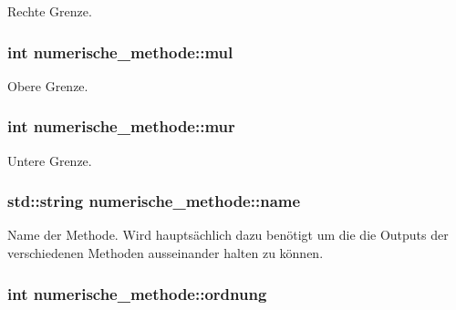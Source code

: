 Rechte Grenze. \hypertarget{classnumerische__methode_a20e0d47e90b9a0f9a83aab2b225a4616}{
\subsubsection[{mul}]{\setlength{\rightskip}{0pt plus 5cm}int numerische\-\_\-methode\-::mul\hspace{0.3cm}{\ttfamily [protected]}}}\label{classnumerische__methode_a20e0d47e90b9a0f9a83aab2b225a4616}
Obere Grenze. \hypertarget{classnumerische__methode_a36f2c35ed9b3448c6bb8656e057ae44a}{
\subsubsection[{mur}]{\setlength{\rightskip}{0pt plus 5cm}int numerische\-\_\-methode\-::mur\hspace{0.3cm}{\ttfamily [protected]}}}\label{classnumerische__methode_a36f2c35ed9b3448c6bb8656e057ae44a}
Untere Grenze. \hypertarget{classnumerische__methode_a08429f7cae828958ced4b62db2cf1021}{
\subsubsection[{name}]{\setlength{\rightskip}{0pt plus 5cm}std\-::string numerische\-\_\-methode\-::name\hspace{0.3cm}{\ttfamily [protected]}}}\label{classnumerische__methode_a08429f7cae828958ced4b62db2cf1021}
Name der Methode. Wird hauptsächlich dazu benötigt um die die Outputs der verschiedenen Methoden ausseinander halten zu können. \hypertarget{classnumerische__methode_ab95e5de8e6d9d0a63e4110dea60825e8}{
\subsubsection[{ordnung}]{\setlength{\rightskip}{0pt plus 5cm}int numerische\-\_\-methode\-::ordnung\hspace{0.3cm}{\ttfamily [protected]}}}\label{classnumerische__methode_ab95e5de8e6d9d0a63e4110dea60825e8}
